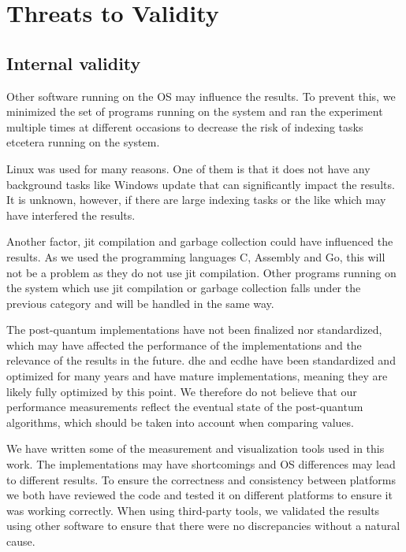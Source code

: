 \section{Threats to Validity}



\subsection{Internal validity}
\label{section:method:internal-validity}
Other software running on the OS may influence the results. To prevent this, we minimized the set of programs running on the system and ran the experiment multiple times at different occasions to decrease the risk of indexing tasks etcetera running on the system.

Linux was used for many reasons. One of them is that it does not have any background tasks like Windows update that can significantly impact the results. It is unknown, however, if there are large indexing tasks or the like which may have interfered the results.

Another factor, \gls{jit} compilation and garbage collection could have influenced the results. As we used the programming languages C, Assembly and Go, this will not be a problem as they do not use \gls{jit} compilation. Other programs running on the system which use \gls{jit} compilation or garbage collection falls under the previous category and will be handled in the same way.

The post-quantum implementations have not been finalized nor standardized, which may have affected the performance of the implementations and the relevance of the results in the future. \gls{dhe} and \gls{ecdhe} have been standardized and optimized for many years and have mature implementations, meaning they are likely fully optimized by this point. We therefore do not believe that our performance measurements reflect the eventual state of the \gls{post-quantum} algorithms, which should be taken into account when comparing values.

We have written some of the measurement and visualization tools used in this work. The implementations may have shortcomings and OS differences may lead to different results. To ensure the correctness and consistency between platforms we both have reviewed the code and tested it on different platforms to ensure it was working correctly. When using third-party tools, we validated the results using other software to ensure that there were no discrepancies without a natural cause.

